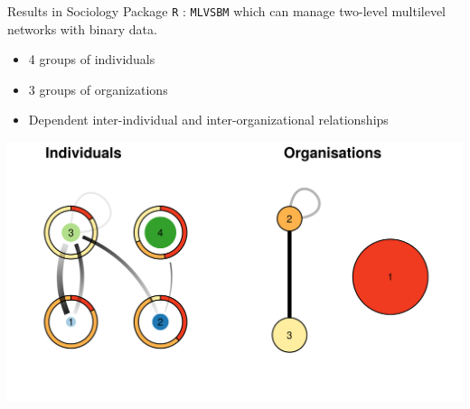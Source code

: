 \documentclass[compress,10pt]{beamer}
\begin{document}
\begin{frame}{Results in Sociology}
Package \texttt{R} : \texttt{MLVSBM} which can manage two-level multilevel networks with binary data. 

\begin{itemize}
\item 4 groups of individuals
\item 3 groups of organizations
\item Dependent inter-individual and inter-organizational relationships
\end{itemize}
 \begin{center}
  \includegraphics [width = 0.7 \linewidth]{plots/deal_summary_clust.png}
  \end{center}
\end{frame}



 
\end{document}
